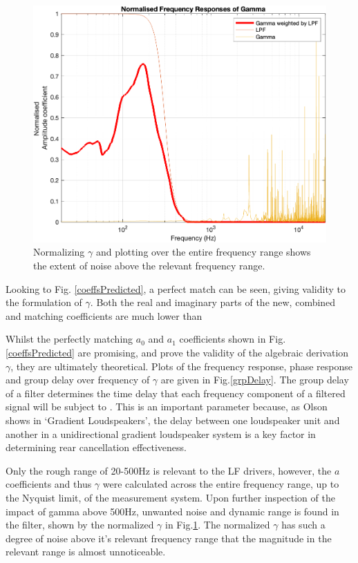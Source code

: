 \documentclass{report}
\begin{document}
            \begin{figure}[H]
                \centering
                \includegraphics[width = 0.6\linewidth]{figs/gammaCompare.png}%
                \caption{Normalizing $\gamma$ and plotting over the entire frequency range shows the extent of noise above the relevant frequency range.}
                \label{gammaCompare}
            \end{figure}

            Looking to Fig. \ref{coeffsPredicted}, a perfect match can be seen, giving validity to the formulation of $\gamma$.
            Both the real and imaginary parts of the new, combined and matching coefficients are much lower than 

            Whilst the perfectly matching $a_0$ and $a_1$ coefficients shown in Fig. \ref{coeffsPredicted} are promising, and prove the validity of the algebraic derivation $\gamma$, they are ultimately theoretical.
            Plots of the frequency response, phase response and group delay over frequency of $\gamma$ are given in Fig.\ref{grpDelay}.
            The group delay of a filter determines the time delay that each frequency component of a filtered signal will be subject to \cite{oppenheim1999discrete} \cite{rabiner1975theory}.
            This is an important parameter because, as Olson shows in `Gradient Loudspeakers', the delay between one loudspeaker unit and another in a unidirectional gradient loudspeaker system is a key factor in determining rear cancellation effectiveness.

            Only the rough range of 20-500Hz is relevant to the LF drivers, however, the $a$ coefficients and thus $\gamma$ were calculated across the entire frequency range, up to the Nyquist limit, of the measurement system.
            Upon further inspection of the impact of gamma above 500Hz, unwanted noise and dynamic range is found in the filter, shown by the normalized $\gamma$ in Fig.\ref{gammaCompare}.
            The normalized $\gamma$ has such a degree of noise above it's relevant frequency range that the magnitude in the relevant range is almost unnoticeable.
\end{document}
